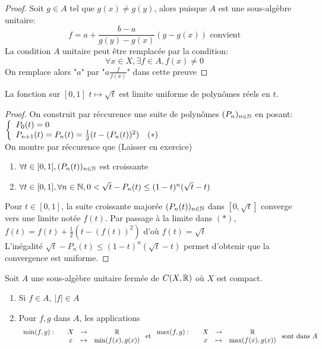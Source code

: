 \documentclass[]{report}
\begin{document}
    \begin{proof}
        Soit $g\in A$ tel que $g(x)\neq g(y)$, alors puisque $A$ est une sous-algèbre unitaire:
        \[f=a+\frac{b-a}{g(y)-g(x)}(g-g(x))\text{ convient}\]
        La condition $A$ unitaire peut être remplacée par la condition:
        \[\forall x\in X,\exists f\in A,f(x)\neq 0\]
        On remplace alors "$a$" par "$a\frac{f}{f(x)}$" dans cette preuve
    \end{proof}

    \begin{lm}{}{}
        La fonction sur $[0,1]$ $t \mapsto \sqrt{t}$ est limite uniforme de polynômes réels en $t$.
    \end{lm}

    \begin{proof}
        On construit par réccurence une suite de polynômes $(P_n)_{n\in\mathbb{N}}$ en posant:
        $\left\{\begin{array}{ll} P_0(t)=0\\P_{n+1}(t)=P_n(t)=\frac{1}{2}(t-(P_n(t))^2)\quad (*) \end{array} \right.$\\
        On montre par réccurence que (Laisser en exercice)
        \begin{enumerate}
            \item $\forall t\in [0,1],(P_n(t))_{n\in\mathbb{N}}$ est croissante
            \item $\forall t\in [0,1],\forall {n\in\mathbb{N}}, 0<\sqrt{t}-P_n(t)\le (1-t)^n(\sqrt{t}-t)$\\
        \end{enumerate}
        Pour $t\in [0,1]$, la suite croissante majorée $(P_n(t))_{n\in\mathbb{N}}$ dans $[0,\sqrt{t}]$ converge vers une limite notée $f(t)$. Par passage à la limite dans $(*)$, $f(t)=f(t)+\frac{1}{2}(t-(f(t))^2)$ d'où $f(t)=\sqrt{t}$\\
        L'inégalité $\sqrt{t}-P_n(t)\le (1-t)^n(\sqrt{t}-t)$ permet d'obtenir que la convergence est uniforme.
    \end{proof}

    \begin{lm}{}{}
        Soit $A$ une sous-algèbre unitaire fermée de $C(X,\mathbb{R})$ où $X$ est compact.
        \begin{enumerate}
            \item Si $f\in A$, $|f|\in A$
            \item Pour $f,g$ dans $A$, les applications
            \[\begin{array}{ccccc} \min(f,g) : & & X & \to & \mathbb{R} \\ & & x & \mapsto & \min(f(x),g(x)) \end{array}\text{ et }\begin{array}{ccccc} \max (f,g) : & & X & \to & \mathbb{R} \\ & & x & \mapsto & \max(f(x),g(x)) \end{array}\text{ sont dans $A$}\]
        \end{enumerate}
    \end{lm}
\end{document}
